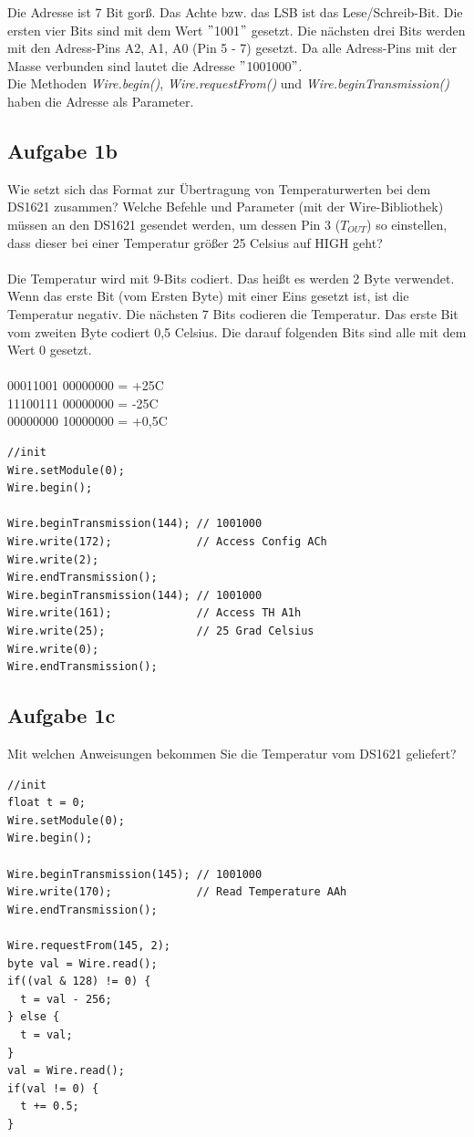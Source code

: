 \noindent Die Adresse ist 7 Bit gor\ss{}. Das Achte bzw. das LSB ist das Lese/Schreib-Bit. Die ersten vier Bits sind mit dem Wert $"$1001$"$ gesetzt. Die nächsten drei Bits werden mit den Adress-Pins A2, A1, A0 (Pin 5 - 7) gesetzt. Da alle Adress-Pins mit der Masse verbunden sind lautet die Adresse $"$1001000$"$.\\
Die Methoden \textit{Wire.begin()}, \textit{Wire.requestFrom()} und \textit{Wire.beginTransmission()} haben die Adresse als Parameter.
\subsection{Aufgabe 1b}
Wie setzt sich das Format zur Übertragung von Temperaturwerten bei dem DS1621 zusammen? Welche Befehle und Parameter (mit der Wire-Bibliothek) müssen an den DS1621 gesendet werden, um dessen Pin 3 ($T_{OUT}$) so einstellen, dass dieser bei einer Temperatur grö\ss{}er 25\textdegree{} Celsius auf HIGH geht?\\ \\
Die Temperatur wird mit 9-Bits codiert. Das hei\ss{}t es werden 2 Byte verwendet. Wenn das erste Bit (vom Ersten Byte) mit einer Eins gesetzt ist, ist die Temperatur negativ. Die nächsten 7 Bits codieren die Temperatur. Das erste Bit vom zweiten Byte codiert 0,5\textdegree{} Celsius. Die darauf folgenden Bits sind alle mit dem Wert 0 gesetzt.\\ \\
00011001 00000000 = +25\textdegree{}C\\
11100111 00000000 = -25\textdegree{}C\\
00000000 10000000 = +0,5\textdegree{}C\\
\begin{lstlisting}
//init
Wire.setModule(0);
Wire.begin();

Wire.beginTransmission(144); // 1001000
Wire.write(172);             // Access Config ACh
Wire.write(2);
Wire.endTransmission();
Wire.beginTransmission(144); // 1001000
Wire.write(161);             // Access TH A1h
Wire.write(25);              // 25 Grad Celsius
Wire.write(0);
Wire.endTransmission();
\end{lstlisting}
\subsection{Aufgabe 1c}
Mit welchen Anweisungen bekommen Sie die Temperatur vom DS1621 geliefert?
\begin{lstlisting}
//init
float t = 0;
Wire.setModule(0);
Wire.begin();

Wire.beginTransmission(145); // 1001000
Wire.write(170);             // Read Temperature AAh
Wire.endTransmission();

Wire.requestFrom(145, 2);
byte val = Wire.read();
if((val & 128) != 0) {
  t = val - 256;
} else {
  t = val;
}
val = Wire.read();
if(val != 0) {
  t += 0.5;
}
\end{lstlisting}
